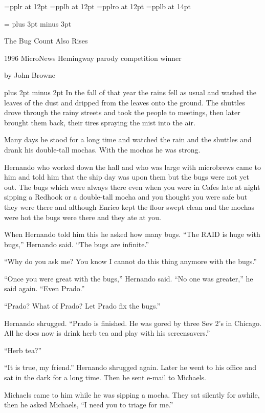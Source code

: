 \font\twelverm=pplr at 12pt
\font\twelvebf=pplb at 12pt
\font\twelvesl=pplro at 12pt
\font\biggerbold=pplb at 14pt
\def\rm{\twelverm}

\footline={\hss\rm\folio\hss} %
\parskip=3pt\baselineskip=14pt %
\rm
\vglue 0.5in plus 3pt minus 3pt
\centerline{\biggerbold The Bug Count Also Rises}
\smallskip
\centerline{1996 {\twelvesl MicroNews} Hemingway parody competition winner}
\centerline{by John Browne}
\vglue 0.5in plus 2pt minus 2pt
\noindent In the fall of that year the rains fell as usual and washed
the leaves of the dust and dripped from the leaves onto the
ground. The shuttles drove through the rainy streets and took the
people to meetings, then later brought them back, their tires spraying
the mist into the air.

Many days he stood for a long time and watched
the rain and the shuttles and drank his double-tall mochas. With the
mochas he was strong.

Hernando who worked down the hall and who was large with microbrews
came to him and told him that the ship day was upon them but the bugs
were not yet out. The bugs which were always there even when you were
in Cafes late at night sipping a Redhook or a double-tall mocha and
you thought you were safe but they were there and although Enrico kept
the floor swept clean and the mochas were hot the bugs were there and
they ate at you.

When Hernando told him this he asked how many bugs.
``The RAID is huge with bugs,'' Hernando said. ``The bugs are infinite.''

``Why do you ask me? You know I cannot do this thing anymore with the
bugs.''

``Once you were great with the bugs,'' Hernando said. ``No one was
greater,'' he said again. ``Even Prado.''

``Prado? What of Prado? Let Prado fix the bugs.''

Hernando shrugged. ``Prado is finished. He was gored by three Sev 2's
in Chicago. All he does now is drink herb tea and play with his
screensavers.''

``Herb tea?''

``It is true, my friend.'' Hernando shrugged again.
Later he went to his office and sat in the dark for a long time. Then
he sent e-mail to Michaels.

Michaels came to him while he was sipping a mocha. They sat silently
for awhile, then he asked Michaels, ``I need you to triage for me.''

